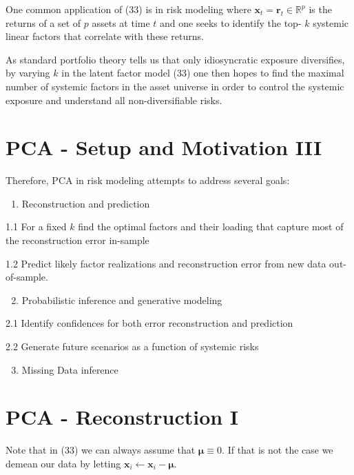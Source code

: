 \documentclass[11pt]{article}
\theoremstyle{plain} %
\theoremstyle{remark}
\begin{document}
One common application of (33) is in risk modeling where $\mathbf{x}_{t}=\mathbf{r}_{t} \in \mathbb{R}^{p}$ is the returns of a set of $p$ assets at time $t$ and one seeks to identify the top- $k$ systemic linear factors that correlate with these returns.

As standard portfolio theory tells us that only idiosyncratic exposure diversifies, by varying $k$ in the latent factor model (33) one then hopes to find the maximal number of systemic factors in the asset universe in order to control the systemic exposure and understand all non-diversifiable risks.

\section*{PCA - Setup and Motivation III}
Therefore, PCA in risk modeling attempts to address several goals:

\begin{enumerate}
  \item Reconstruction and prediction
\end{enumerate}

1.1 For a fixed $k$ find the optimal factors and their loading that capture most of the reconstruction error in-sample

1.2 Predict likely factor realizations and reconstruction error from new data out-of-sample.

\begin{enumerate}
  \setcounter{enumi}{1}
  \item Probabilistic inference and generative modeling
\end{enumerate}

2.1 Identify confidences for both error reconstruction and prediction

2.2 Generate future scenarios as a function of systemic risks

\begin{enumerate}
  \setcounter{enumi}{2}
  \item Missing Data inference
\end{enumerate}

\section*{PCA - Reconstruction I}
Note that in (33) we can always assume that $\boldsymbol{\mu} \equiv 0$. If that is not the case we demean our data by letting $\mathbf{x}_{i} \leftarrow \mathbf{x}_{i}-\boldsymbol{\mu}$.
\end{document}
